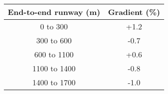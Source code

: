 \begin{tabular}{|c|c|}
\hline
\textbf{End-to-end runway (m)} & \textbf{Gradient (\%)} \\
\hline
0 to 300 & +1.2 \\
300 to 600 & -0.7 \\
600 to 1100 & +0.6 \\
1100 to 1400 & -0.8 \\
1400 to 1700 & -1.0 \\
\hline
\end{tabular}
